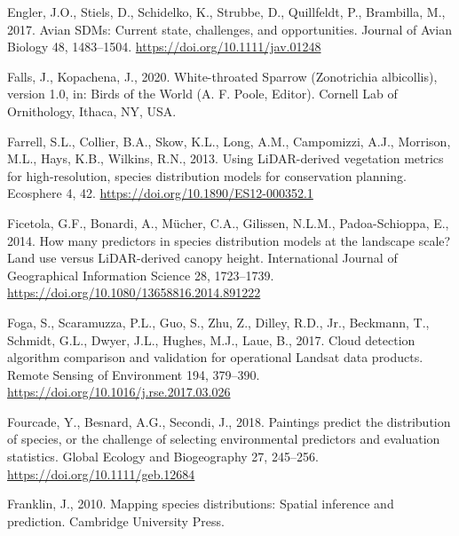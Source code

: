 \documentclass[
  12pt,
]{article}
\newlength{\cslhangindent}
\newlength{\cslentryspacingunit} %
\newenvironment{CSLReferences}[2] %
 {%
  \setlength{\parindent}{0pt}
  \ifodd #1
  \let\oldpar\par
  \def\par{\hangindent=\cslhangindent\oldpar}
  \fi
  \setlength{\parskip}{#2\cslentryspacingunit}
 }%
 {}
\begin{document}
\begin{CSLReferences}{1}{0}
\leavevmode{}%
Engler, J.O., Stiels, D., Schidelko, K., Strubbe, D., Quillfeldt, P., Brambilla, M., 2017. Avian {SDMs}: Current state, challenges, and opportunities. Journal of Avian Biology 48, 1483--1504. \url{https://doi.org/10.1111/jav.01248}

\leavevmode{}%
Falls, J., Kopachena, J., 2020. White-throated {Sparrow} ({Zonotrichia} albicollis), version 1.0, in: Birds of the {World} ({A}. {F}. {Poole}, {Editor}). Cornell Lab of Ornithology, Ithaca, NY, USA.

\leavevmode{}%
Farrell, S.L., Collier, B.A., Skow, K.L., Long, A.M., Campomizzi, A.J., Morrison, M.L., Hays, K.B., Wilkins, R.N., 2013. Using {LiDAR}-derived vegetation metrics for high-resolution, species distribution models for conservation planning. Ecosphere 4, 42. \url{https://doi.org/10.1890/ES12-000352.1}

\leavevmode{}%
Ficetola, G.F., Bonardi, A., Mücher, C.A., Gilissen, N.L.M., Padoa-Schioppa, E., 2014. How many predictors in species distribution models at the landscape scale? {Land} use versus {LiDAR}-derived canopy height. International Journal of Geographical Information Science 28, 1723--1739. \url{https://doi.org/10.1080/13658816.2014.891222}

\leavevmode{}%
Foga, S., Scaramuzza, P.L., Guo, S., Zhu, Z., Dilley, R.D., Jr., Beckmann, T., Schmidt, G.L., Dwyer, J.L., Hughes, M.J., Laue, B., 2017. Cloud detection algorithm comparison and validation for operational {Landsat} data products. Remote Sensing of Environment 194, 379--390. \url{https://doi.org/10.1016/j.rse.2017.03.026}

\leavevmode{}%
Fourcade, Y., Besnard, A.G., Secondi, J., 2018. Paintings predict the distribution of species, or the challenge of selecting environmental predictors and evaluation statistics. Global Ecology and Biogeography 27, 245--256. \url{https://doi.org/10.1111/geb.12684}

\leavevmode{}%
Franklin, J., 2010. Mapping species distributions: Spatial inference and prediction. Cambridge University Press.


\end{CSLReferences}
\end{document}
